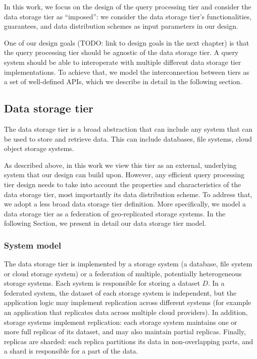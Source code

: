 In this work, we focus on the design of the query processing tier and consider the data storage tier as ``imposed'':
we consider the data storage tier's functionalities, guarantees, and data distribution schemes as input parameters in
our design.

One of our design goals
(TODO: link to design goals in the next chapter)
is that the query processing tier should be agnostic of the data storage tier.
A query system should be able to interoperate with multiple different data storage tier implementations.
To achieve that, we model the interconnection between tiers as a set of well-defined APIs, which we describe
in detail in the following section.


\subsection{Data storage tier}

The data storage tier is a broad abstraction that can include any system that can be used to store and retrieve data.
This can include databases, file systems, cloud object storage systems.

As described above, in this work we view this tier as an external, underlying system that our design can build upon.
However, any efficient query processing tier design needs to take into account the properties and characteristics of the
data storage tier, most importantly its data distribution scheme.
To address that, we adopt a less broad data storage tier definition.
More specifically, we model a data storage tier as a federation of geo-replicated storage systems.
In the following Section, we present in detail our data storage tier model.


\subsubsection{System model}
The data storage tier is implemented by a storage system (a database, file system or cloud storage system) or a
federation of multiple, potentially heterogeneous storage systems.
Each system is responsible for storing a dataset $D$.
In a federated system, the dataset of each storage system is independent, but the application logic may implement
replication across different systems (for example an application that replicates data across multiple cloud providers).
In addition, storage systems implement replication:
each storage system maintains one or more full replicas of its dataset, and may also maintain partial replicas.
Finally, replicas are sharded: each replica partitions its data in non-overlapping parts, and a shard is responsible
for a part of the data.

